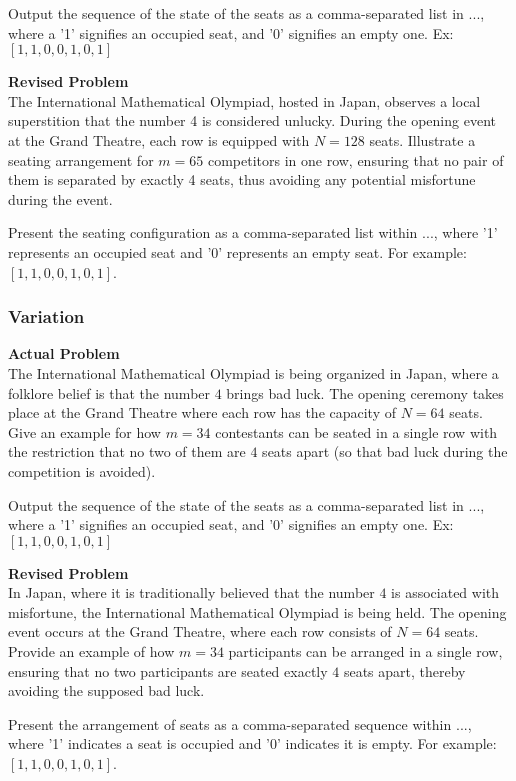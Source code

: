 Output the sequence of the state of the seats as a comma-separated list in $\boxed{...}$, where a '1' signifies an occupied seat, and '0' signifies an empty one. Ex: $\boxed{[1,1,0,0,1,0,1]}$

\textbf{Revised Problem}\\
The International Mathematical Olympiad, hosted in Japan, observes a local superstition that the number 4 is considered unlucky. During the opening event at the Grand Theatre, each row is equipped with $N=128$ seats. Illustrate a seating arrangement for $m = 65$ competitors in one row, ensuring that no pair of them is separated by exactly 4 seats, thus avoiding any potential misfortune during the event.

Present the seating configuration as a comma-separated list within $\boxed{...}$, where '1' represents an occupied seat and '0' represents an empty seat. For example: $\boxed{[1,1,0,0,1,0,1]}$.

\subsubsection{Variation}
\textbf{Actual Problem}\\
The International Mathematical Olympiad is being organized in Japan, where a folklore belief is that the number $4$ brings bad luck. The opening ceremony takes place at the Grand Theatre where each row has the capacity of $N=64$ seats. Give an example for how $m = 34$ contestants can be seated in a single row with the restriction that no two of them are $4$ seats apart (so that bad luck during the competition is avoided).

Output the sequence of the state of the seats as a comma-separated list in $\boxed{...}$, where a '1' signifies an occupied seat, and '0' signifies an empty one. Ex: $\boxed{[1,1,0,0,1,0,1]}$

\textbf{Revised Problem}\\
In Japan, where it is traditionally believed that the number $4$ is associated with misfortune, the International Mathematical Olympiad is being held. The opening event occurs at the Grand Theatre, where each row consists of $N=64$ seats. Provide an example of how $m = 34$ participants can be arranged in a single row, ensuring that no two participants are seated exactly $4$ seats apart, thereby avoiding the supposed bad luck.

Present the arrangement of seats as a comma-separated sequence within $\boxed{...}$, where '1' indicates a seat is occupied and '0' indicates it is empty. For example: $\boxed{[1,1,0,0,1,0,1]}$.

